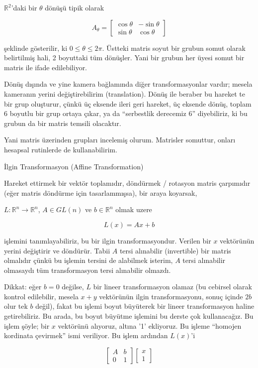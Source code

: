 \documentclass[12pt,fleqn]{article}\usepackage{../../common}
\begin{document}
$\mathbb{R}^2$'daki bir $\theta$ dönüşü tipik olarak

$$ A_\theta = \left[\begin{array}{rr}
\cos \theta & -\sin \theta \\
\sin \theta & \cos \theta
\end{array}\right] $$

şeklinde gösterilir, ki $0 \le \theta \le 2\pi$. Üstteki matris soyut bir
grubun somut olarak belirtilmiş hali, 2 boyuttaki tüm dönüşler. Yani bir
grubun her üyesi somut bir matris ile ifade edilebiliyor.

Dönüş dışında ve yine kamera bağlamında diğer transformasyonlar vardır;
mesela kameranın yerini değiştirebilirim (translation). Dönüş ile beraber
bu hareket te bir grup oluşturur, çünkü üç eksende ileri geri hareket, üç
eksende dönüş, toplam 6 boyutlu bir grup ortaya çıkar, ya da ``serbestlik
derecemiz 6'' diyebiliriz, ki bu grubun da bir matris temsili olacaktır. 

Yani matris üzerinden grupları incelemiş olurum. Matrisler somuttur, onları
hesapsal rutinlerde de kullanabilirim. 

İlgin Transformasyon (Affine Transformation) 

Hareket ettirmek bir vektör toplamıdır, döndürmek / rotasyon matris
çarpımıdır (eğer matris döndürme için tasarlammışsa), bir araya koyarsak,

$L: \mathbb{R}^n \to \mathbb{R}^n$, $A \in GL(n)$ ve $b \in \mathbb{R}^n$ olmak uzere

$$ L(x) = Ax + b $$

işlemini tanımlayabiliriz, bu bir ilgin transformasyondur. Verilen bir $x$
vektörünün yerini değiştirir ve döndürür. Tabii $A$ tersi alınabilir
(invertible) bir matris olmalıdır çünkü bu işlemin tersini de alabilmek
isterim, $A$ tersi alınabilir olmasaydı tüm transformasyon tersi alınabilir
olmazdı. 

Dikkat: eğer $b=0$ değilse, $L$ bir lineer transformasyon olamaz (bu
cebirsel olarak kontrol edilebilir, mesela $x+y$ vektörünün ilgin
transformasyonu, sonuç içinde $2b$ olur tek $b$ değil), fakat bu işlemi
boyut büyüterek bir lineer transformasyon haline getirebiliriz. Bu arada,
bu boyut büyütme işlemini bu derste çok kullanacağız. Bu işlem şöyle; bir
$x$ vektörünü alıyoruz, altına '1' ekliyoruz. Bu işleme ``homojen kordinata
çevirmek'' ismi veriliyor. Bu işlem ardından $L(x)$'i

$$ \left[\begin{array}{rr}
A & b \\ 0 & 1
\end{array}\right]
\left[\begin{array}{r}
x \\ 1
\end{array}\right]
$$
\end{document}
